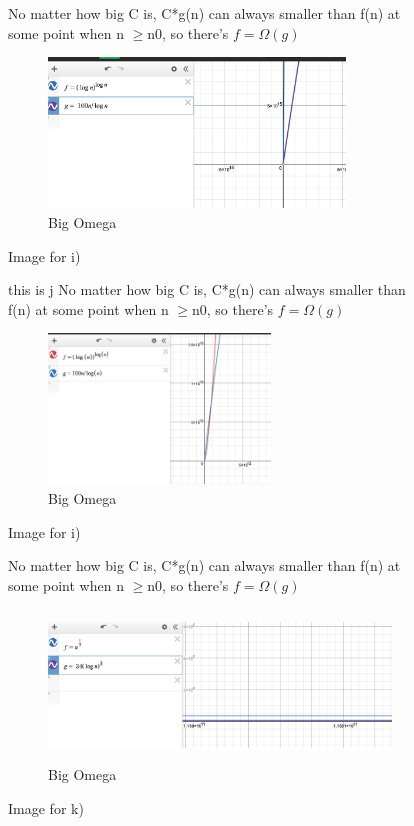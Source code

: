 \documentclass{article}
\begin{document}
\begin{enumerate}[label=(\alph*)]
\begin{figure}[h]    
\item %
No matter how big C is, C*g(n) can always smaller than f(n) at some point when n $\ge $n0, so there's $f = \Omega(g)$\\
    \begin{subfigure}{0.5\textwidth}
    \includegraphics[width=0.9\linewidth, height=4cm]{i) big omega.png}
    \caption{Big Omega}
    \label{fig:subim1}
    \end{subfigure}
    \caption{Image for i)}
    \label{fig:image2}
    \end{figure}
\begin{figure}[h]
\item  this is j
No matter how big C is, C*g(n) can always smaller than f(n) at some point when n $\ge $n0, so there's $f = \Omega(g)$\\
    \begin{subfigure}{0.5\textwidth}
    \includegraphics[width=0.9\linewidth, height=4cm]{j) big Omega.png}
    \caption{Big Omega}
    \label{fig:subim1}
    \end{subfigure}
    \caption{Image for i)}
    \label{fig:image2}
    \end{figure} 
\begin{figure}[h]
\item %
No matter how big C is, C*g(n) can always smaller than f(n) at some point when n $\ge $n0, so there's $f = \Omega(g)$\\
    \begin{subfigure}{0.5\textwidth}
    \includegraphics[width=0.9\linewidth, height=4cm]{k) big omega.png}
    \caption{Big Omega}
    \label{fig:subim1}
    \end{subfigure}
    \caption{Image for k)}
    \label{fig:image2}
    \end{figure}


\end{enumerate}
\end{document}

